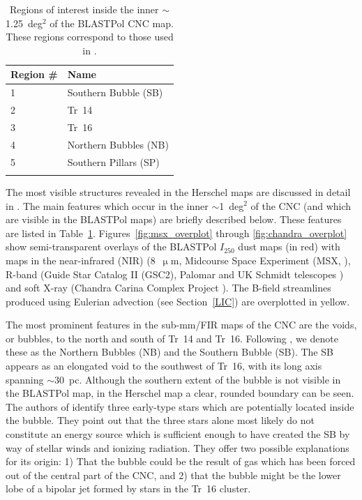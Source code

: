 \begin{table}[!htbp]
\centering
\begin{tabular}{@{}ll@{}}
\dtoprule
Region \# & Name \\ \midrule
1 & Southern Bubble (SB) \\
2 & Tr~14 \\
3 & Tr~16 \\
4 & Northern Bubbles (NB) \\
5 & Southern Pillars (SP) \\ \bottomrule
\\
\end{tabular}
\caption[~Regions of interest inside the inner  of the BLASTPol CNC map.]{Regions of interest inside the inner $\sim$1.25~deg$^{2}$ of the BLASTPol CNC map. These regions correspond to those used in \citet{preibisch2012herschel}.}
\label{table:regions}
\end{table}

The most visible structures revealed in the Herschel maps are discussed in detail in \citet{preibisch2012herschel}. The main features which occur in the inner $\sim$1~deg$^{2}$ of the CNC (and which are visible in the BLASTPol maps) are briefly described below. These features are listed in Table~\ref{table:regions}. Figures~\ref{fig:msx_overplot} through \ref{fig:chandra_overplot} show semi-transparent overlays of the BLASTPol $I_{250}$ dust maps (in red) with maps in the near-infrared (NIR) (8~$\upmu$m, Midcourse Space Experiment (MSX, \citet{smith2000large}), R-band (Guide Star Catalog II (GSC2), Palomar and UK Schmidt telescopes \citep{lasker2008second}) and soft X-ray (Chandra Carina Complex Project \citep{townsley2011introduction}). The B-field streamlines produced using Eulerian advection (see Section~\ref{LIC}) are overplotted in yellow.

The most prominent features in the sub-mm/FIR maps of the CNC are the voids, or bubbles, to the north and south of Tr~14 and Tr~16. Following \citet{preibisch2012herschel}, we denote these as the Northern Bubbles (NB) and the Southern Bubble (SB). The SB appears as an elongated void to the southwest of Tr~16, with its long axis spanning $\sim$30~pc. Although the southern extent of the bubble is not visible in the BLASTPol map, in the Herschel map a clear, rounded boundary can be seen. The authors of \citet{preibisch2012herschel} identify three early-type stars which are potentially located inside the bubble. They point out that the three stars alone most likely do not constitute an energy source which is sufficient enough to have created the SB by way of stellar winds and ionizing radiation. They offer two possible explanations for its origin: 1) That the bubble could be the result of gas which has been forced out of the central part of the CNC, and 2) that the bubble might be the lower lobe of a bipolar jet formed by stars in the Tr~16 cluster.

